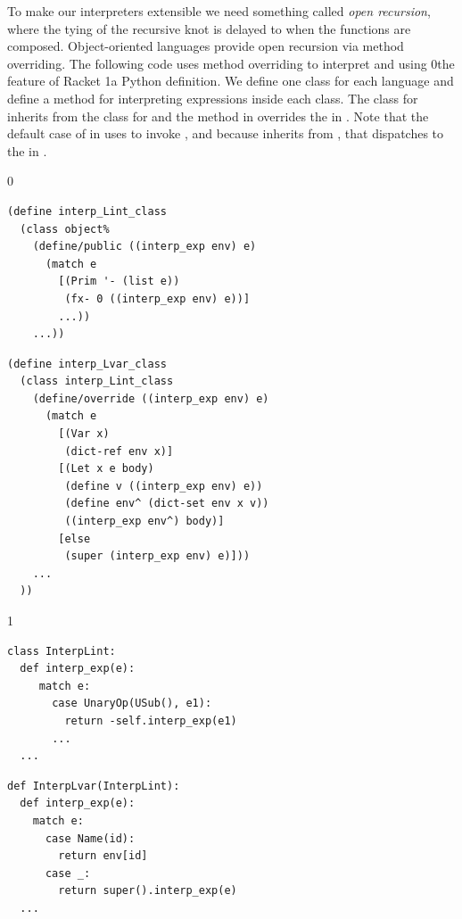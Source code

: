 \documentclass[7x10,nocrop]{TimesAPriori_MIT}%
\def\racketEd{0}
\def\pythonEd{1}
\def\edition{1}
\newcommand{\racket}[1]{{\if\edition\racketEd{#1}\fi}}
\newcommand{\python}[1]{{\if\edition\pythonEd #1\fi}}
\begin{document}
To make our interpreters extensible we need something called
\emph{open recursion}, where the tying of the
recursive knot is delayed to when the functions are
composed. Object-oriented languages provide open recursion via
method overriding. The
following code uses method overriding to interpret \LangInt{} and
\LangVar{} using
%
\racket{the
  \href{https://docs.racket-lang.org/guide/classes.html}{\code{class}}
  \index{subject}{class} feature of Racket}
%
\python{a Python  definition}.
%
We define one class for each language and define a method for
interpreting expressions inside each class. The class for \LangVar{}
inherits from the class for \LangInt{} and the method
 in \LangVar{} overrides the  in
\LangInt{}. Note that the default case of  in
\LangVar{} uses  to invoke , and because
\LangVar{} inherits from \LangInt{}, that dispatches to the
 in \LangInt{}.
\begin{center}
  \hspace{-20pt}
{\if\edition\racketEd  
\begin{minipage}{0.45\textwidth}
\begin{lstlisting}
(define interp_Lint_class
  (class object%
    (define/public ((interp_exp env) e)
      (match e
        [(Prim '- (list e))
         (fx- 0 ((interp_exp env) e))]
        ...))
    ...))
\end{lstlisting}
\end{minipage}
\begin{minipage}{0.45\textwidth}
  \begin{lstlisting}
(define interp_Lvar_class
  (class interp_Lint_class
    (define/override ((interp_exp env) e)
      (match e
        [(Var x)
         (dict-ref env x)]
        [(Let x e body)
         (define v ((interp_exp env) e))
         (define env^ (dict-set env x v))
         ((interp_exp env^) body)]
        [else
         (super (interp_exp env) e)]))
    ...
  ))
\end{lstlisting}
\end{minipage}
\fi}
{\if\edition\pythonEd
\begin{minipage}{0.45\textwidth}
\begin{lstlisting}
class InterpLint:
  def interp_exp(e):
     match e:
       case UnaryOp(USub(), e1):
         return -self.interp_exp(e1)
       ...
  ...
\end{lstlisting}
\end{minipage}
\begin{minipage}{0.45\textwidth}
  \begin{lstlisting}
def InterpLvar(InterpLint):
  def interp_exp(e):
    match e:
      case Name(id):
        return env[id]
      case _:
        return super().interp_exp(e)
  ...
\end{lstlisting}
\end{minipage}
\fi}
\end{center}
\end{document}

